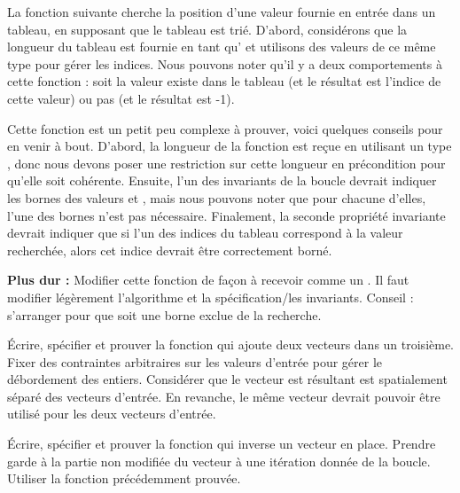La fonction suivante cherche la position d'une valeur fournie en entrée dans
un tableau, en supposant que le tableau est trié. D'abord, considérons que la
longueur du tableau est fournie en tant qu' et utilisons des valeurs de ce
même type pour gérer les indices. Nous pouvons noter qu'il y a deux comportements
à cette fonction : soit la valeur existe dans le tableau (et le résultat est
l'indice de cette valeur) ou pas (et le résultat est -1).




Cette fonction est un petit peu complexe à prouver, voici quelques conseils
pour en venir à bout. D'abord, la longueur de la fonction est reçue en utilisant
un type , donc nous devons poser une restriction sur cette longueur en
précondition pour qu'elle soit cohérente. Ensuite, l'un des invariants de la
boucle devrait indiquer les bornes des valeurs  et
, mais nous pouvons noter que pour chacune d'elles, l'une des
bornes n'est pas nécessaire. Finalement, la seconde propriété invariante
devrait indiquer que si l'un des indices du tableau correspond à la valeur
recherchée, alors cet indice devrait être correctement borné.


\textbf{Plus dur :} Modifier cette fonction de façon à recevoir 
comme un . Il faut modifier légèrement l'algorithme et
la spécification/les invariants. Conseil : s'arranger pour que 
soit une borne exclue de la recherche.




Écrire, spécifier et prouver la fonction qui ajoute deux vecteurs dans un
troisième. Fixer des contraintes arbitraires sur les valeurs d'entrée pour
gérer le débordement des entiers. Considérer que le vecteur est résultant est
spatialement séparé des vecteurs d'entrée. En revanche, le même vecteur devrait
pouvoir être utilisé pour les deux vecteurs d'entrée.






Écrire, spécifier et prouver la fonction qui inverse un vecteur en place.
Prendre garde à la partie non modifiée du vecteur à une itération donnée de la
boucle. Utiliser la fonction  précédemment prouvée.





